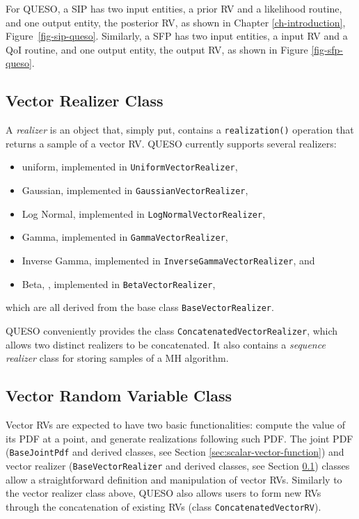 For QUESO, a SIP has two input entities, a prior RV and
a likelihood routine, and one output entity, the posterior RV, as shown in Chapter \ref{ch-introduction}, Figure~\ref{fig-sip-queso}.
%
Similarly, a SFP has two input entities, a input RV and
a QoI routine, and one output entity, the output RV, as shown in Figure \ref{fig-sfp-queso}.


\subsection{Vector Realizer Class}\label{sec:vector-realizer-class}
%
A {\it realizer} is an object that, simply put, contains a \verb+realization()+ operation that returns a sample of a vector RV.
QUESO currently supports several realizers:
\begin{itemize}
 \item uniform, implemented in \verb+UniformVectorRealizer+,                \vspace{-8pt}
\item Gaussian, implemented in \verb+GaussianVectorRealizer+,               \vspace{-8pt}
\item Log Normal, implemented in \verb+LogNormalVectorRealizer+,            \vspace{-8pt}
\item Gamma,  implemented in \verb+GammaVectorRealizer+,                    \vspace{-8pt}
\item Inverse Gamma, implemented in \verb+InverseGammaVectorRealizer+, and  \vspace{-8pt}
\item Beta, , implemented in \verb+BetaVectorRealizer+,                     \vspace{-8pt}
\end{itemize}
which are all derived from the base class \verb+BaseVectorRealizer+.

QUESO conveniently provides the class \verb+ConcatenatedVectorRealizer+, which allows two distinct realizers to be concatenated.
It also contains a {\it sequence realizer} class for storing samples of a MH algorithm.




\subsection{Vector Random Variable Class}
%
Vector RVs are expected to have two basic functionalities:
compute the value of its PDF at a point, and generate realizations following such PDF.
The joint PDF (\verb+BaseJointPdf+ and derived classes, see Section \ref{sec:scalar-vector-function}) and vector realizer  (\verb+BaseVectorRealizer+ and derived classes, see Section \ref{sec:vector-realizer-class}) classes allow a straightforward definition and manipulation of vector RVs. Similarly to the vector realizer class above, QUESO also allows users to form new RVs through the concatenation of existing RVs (class \verb+ConcatenatedVectorRV+).

